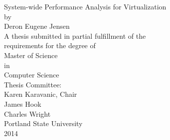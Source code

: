 \begin{centering}
\vspace*{1in}
System-wide Performance Analysis for Virtualization \\
\vspace{6\baselineskip}\vspace{-\parskip}
by \\
\vspace{1\baselineskip}\vspace{-\parskip}
Deron Eugene Jensen \\
\vspace{7\baselineskip}\vspace{-\parskip}
A thesis submitted in partial fulfillment of the \\
requirements for the degree of \\
\vspace{2.8\baselineskip}\vspace{-\parskip}
Master of Science \\
in \\
Computer Science \\
\vspace{2.8\baselineskip}\vspace{-\parskip}
Thesis Committee: \\
Karen Karavanic, Chair \\
James Hook \\
Charles Wright \\
\vspace{3\baselineskip}\vspace{-\parskip}
Portland State University \\
2014\\
\end{centering}
